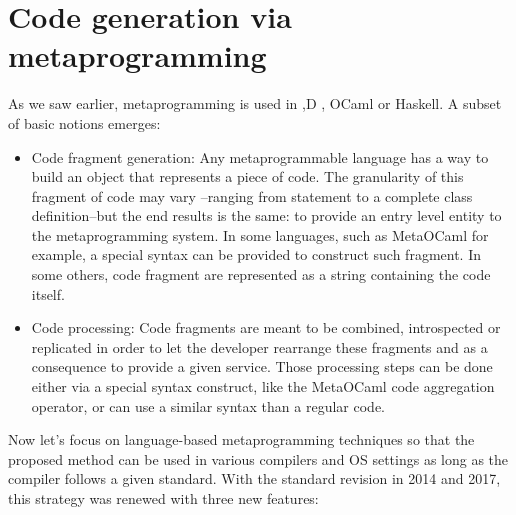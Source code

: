 \documentclass[../main]{subfiles}
\begin{document}
\section{
  Code generation via metaprogramming
}

As we saw earlier, metaprogramming is used in \cpp \cite{hpcs9},D \cite{hpcs10},
OCaml\cite{hpcs11} or Haskell\cite{hpcs12}. A subset of basic notions emerges:

\begin{itemize}
\item
Code fragment generation:
Any metaprogrammable
language has a way to build an object that represents a
piece of code. The granularity of this fragment of code
may vary –ranging from statement to a complete class
definition–but the end results is the same: to provide
an entry level entity to the metaprogramming system.
In some languages, such as MetaOCaml for example,
a special syntax can be provided to construct such
fragment. In some others, code fragment are represented
as a string containing the code itself.

\item
Code processing:
Code fragments are meant to
be combined, introspected or replicated in order to
let the developer rearrange these fragments and as a
consequence to provide a given service. Those processing
steps can be done either via a special syntax construct,
like the MetaOCaml code aggregation operator, or can
use a similar syntax than a regular code.

\end{itemize}

Now let's focus on language-based metaprogramming
techniques so that the proposed method can
be used in various compilers and OS settings as long as the
compiler follows a given standard.
With the standard \cpp revision in 2014 and 2017, this
strategy was renewed with three new \cpp features:
\end{document}
